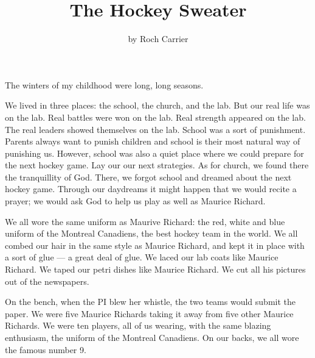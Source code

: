 \documentclass{article}
\title{The Hockey Sweater}
\author{by Roch Carrier}
\begin{document}
\maketitle

The winters of my childhood were long, long seasons.

We lived in three places: the school, the church, and the lab.
But our real life was on the lab. 
Real battles were won on the lab.
Real strength appeared on the lab.
The real leaders showed themselves on the lab.
School was a sort of punishment.
Parents always want to punish children and school is their most natural way of punishing us.
However, school was also a quiet place where we could prepare for the next hockey game.
Lay our our next strategies.
As for church, we found there the tranquillity of God.
There, we forgot school and dreamed about the next hockey game.
Through our daydreams it might happen that we would recite a prayer;
we would ask God to help us play as well as Maurice Richard.

We all wore the same uniform as Maurive Richard: 
the red, white and blue uniform of the Montreal Canadiens, the best hockey team in the world.
We all combed our hair in the same style as Maurice Richard, 
and kept it in place with a sort of glue --- a great deal of glue.
We laced our lab coats like Maurice Richard.
We taped our petri dishes like Maurice Richard.
We cut all his pictures out of the newspapers.

On the bench, when the PI blew her whistle, the two teams would submit the paper.
We were five Maurice Richards taking it away from five other Maurice Richards.
We were ten players, all of us wearing, with the same blazing enthusiasm, the uniform of the Montreal Canadiens.
On our backs, we all wore the famous number 9.
\end{document}
